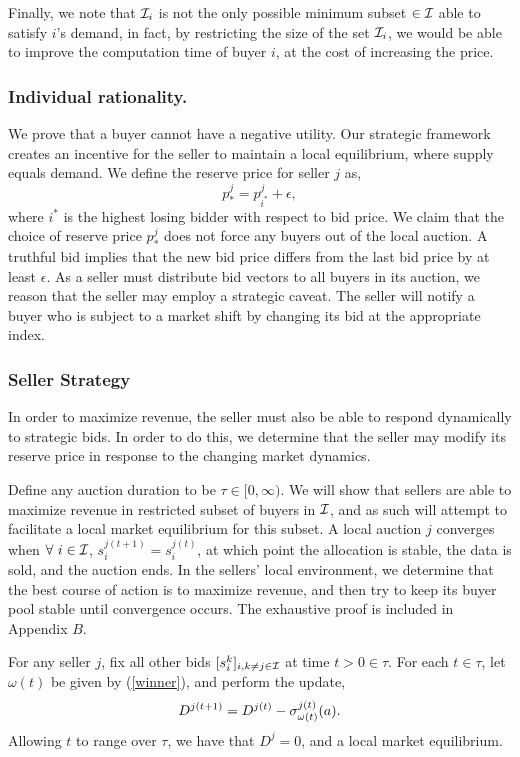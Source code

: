 Finally, we note that $\mathcal{I}_i$ is not the only
possible minimum subset $\in\mathcal{I}$ able to satisfy $i$'s demand, in fact, by
restricting the size of the set $\mathcal{I}_i$, we would be able to improve the
computation time of buyer $i$, at the cost of increasing the price.
 
\subsubsection{Individual rationality.}
We prove that a buyer cannot have a negative utility. Our
strategic framework creates an incentive for the seller to maintain a local
equilibrium, where supply equals demand. 
We define the reserve price for seller $j$ as,
\begin{equation}\label{newprice}
    p_*^{j} = p_{i^*}^{j} + \epsilon,
\end{equation}
where $i^*$ is the highest losing bidder with respect to bid price.
We claim that the choice of reserve price $p_*^j$ does not force any buyers out
of the local auction. 
A truthful bid implies that the new bid price differs from the last bid price by at least
$\epsilon$. As a seller must distribute bid vectors to all
buyers in its auction, we reason that the seller may employ a strategic caveat.
The seller will notify a buyer who is subject to a market shift by changing its
bid at the appropriate index.

\subsubsection{Seller Strategy}
In order to
maximize revenue, the seller must also be able to respond dynamically to
strategic bids. In order to do this, we
determine that the seller may modify its reserve price in response to the
changing market dynamics.

Define any auction duration to be $\tau \in [0,\infty)$. 
We will show that sellers are able to maximize revenue in restricted subset of
buyers in $\mathcal{I}$, and as such will attempt to facilitate a local market
equilibrium for this subset. A local auction $j$ converges when $\forall \ i \in\mathcal{I}$,
$s_i^{j(t+1)} = s_i^{j(t)}$, at which point the allocation is stable, the data
is sold, and the auction ends. In the sellers' local environment, we determine
that the best course of action is to maximize revenue, and then try to keep its
buyer pool stable until convergence occurs. The exhaustive proof is included in
Appendix $B$.

{
\label{sellerstrategy}
For any seller $j$, fix all other bids $[s_i^k]_{i,k\ne j \in\mathcal{I}}$ at time $t>0\in\tau$.
For each $t\in\tau$, let $\omega(t)$ be given by (\ref{winner}), and perform
the update,
\begin{equation}\label{newdata}
    D^{j(t+1)} = D^{j(t)} - \sigma_{\omega(t)}^{j(t)}(a).
\end{equation}
Allowing $t$ to range over $\tau$, we have that $D^j=0$, and a local market equilibrium. 
}

